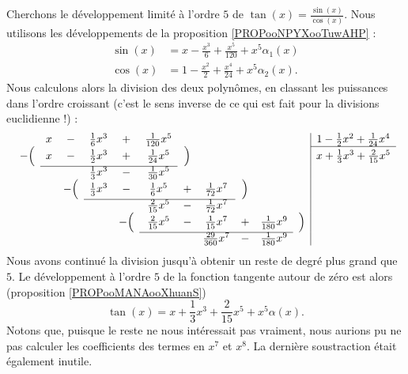 \begin{example}
	Cherchons le développement limité à l'ordre \( 5\) de \( \tan(x)=\frac{ \sin(x) }{ \cos(x) }\). Nous utilisons les développements de la proposition \ref{PROPooNPYXooTuwAHP} :
	\begin{subequations}
		\begin{align}
			\sin(x) & =x-\frac{ x^3 }{ 6 }+\frac{ x^5 }{ 120 }+x^5\alpha_1(x) \\
			\cos(x) & =1-\frac{ x^2 }{ 2 }+\frac{ x^4 }{ 24 }+x^5\alpha_2(x).
		\end{align}
	\end{subequations}
	Nous calculons alors la division des deux polynômes, en classant les puissances dans l'ordre croissant (c'est le sens inverse de ce qui est fait pour la divisions euclidienne !) :
	\begin{equation*}
		\begin{array}[]{ccccccccccc|c}
			       & x & -      & \frac{1}{ 6 }x^3 & +      & \frac{1}{ 120 }x^5  &       &                       &       &                    &       & 1-\frac{ 1 }{2}x^2+\frac{1}{ 24 }x^4   \\
			\cline{12-12}
			-\Big( & x & -      & \frac{ 1 }{2}x^3 & +      & \frac{1}{ 24 }x^5   & \Big) &                       &       &                    &       & x+\frac{1}{ 3 }x^3+\frac{ 2 }{ 15 }x^5 \\
			\cline{2-6}
			       &   &        & \frac{1}{ 3 }x^3 & -      & \frac{1}{ 30 }x^5   &       &                       &       &                    &       &                                        \\
			       &   & -\Big( & \frac{1}{ 3 }x^3 & -      & \frac{1}{ 6 }x^5    & +     & \frac{1}{ 72 }x^7     & \Big) &                    &                                                \\
			\cline{4-8}
			       &   &        &                  &        & \frac{ 2 }{ 15 }x^5 & -     & \frac{1}{ 72 }x^7     &       &                    &                                                \\
			       &   &        &                  & -\Big( & \frac{ 2 }{ 15 }x^5 & -     & \frac{1}{ 15 }x^7     & +     & \frac{1}{ 180 }x^9 & \Big) &                                        \\
			\cline{6-10}
			       &   &        &                  &        &                     &       & \frac{ 29 }{ 360 }x^7 & -     & \frac{1}{ 180 }x^9 &       &                                        \\
		\end{array}
	\end{equation*}
	Nous avons continué la division jusqu'à obtenir un reste de degré plus grand que \( 5\). Le développement à l'ordre $5$ de la fonction tangente autour de zéro est alors (proposition \ref{PROPooMANAooXhuanS})
	\begin{equation}
		\tan(x)=x+\frac{1}{ 3 }x^3+\frac{ 2 }{ 15 }x^5+x^5\alpha(x).
	\end{equation}
	Notons que, puisque le reste ne nous intéressait pas vraiment, nous aurions pu ne pas calculer les coefficients des termes en \( x^7\) et \( x^8\). La dernière soustraction était également inutile.
\end{example}

